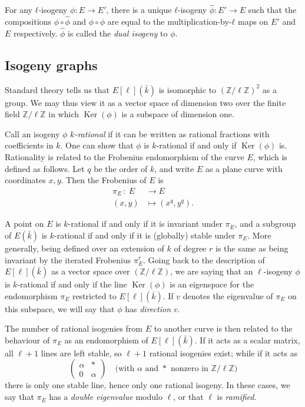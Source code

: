 \documentclass{article}
\newcommand{\Z}{\mathbb{Z}}
\newcommand{\from}{\ensuremath{\,:\ }}
\theoremstyle{definition}
\DeclareMathOperator{\Ker}{Ker}
\begin{document}
For any $ℓ$-isogeny $ϕ:E→E'$, there is a unique $ℓ$-isogeny
$\hat{ϕ}:E'→E$ such that the compositions $ϕ∘\hat{ϕ}$ and $\hat{ϕ}∘ϕ$
are equal to the multiplication-by-$ℓ$ maps on $E'$ and $E$
respectively. $\hat{ϕ}$ is called the \emph{dual isogeny} to $ϕ$.


\subsection{Isogeny graphs}


Standard theory tells us that $E[\ell](\bar{k})$ is isomorphic to $(\Z/\ell\Z)^2$
as a group. We may thus view it as a vector space of dimension two over the 
finite field $\Z/\ell\Z$ in which $\Ker(\phi)$ is a subspace of dimension one. 

Call an isogeny $\phi$ \emph{$k$-rational} if it can be written as rational 
fractions with coefficients in $k$. One can show that $\phi$ is $k$-rational if 
and only if $\Ker(\phi)$ is.
Rationality is related to the Frobenius endomorphism of the curve $E$, which is 
defined as follows. Let $q$ be the order of $k$, and write $E$ as a plane curve 
with coordinates $x, y$. Then the Frobenius of $E$ is
\[
\begin{aligned}
\pi_E \from E &\to E \\
 (x, y) &\mapsto (x^q, y^q).
\end{aligned}
\]

A point on $E$ is $k$-rational if and only if it is invariant under $\pi_E$, 
and a subgroup of $E(\bar{k})$ is $k$-rational if and only if it is (globally) 
stable under $\pi_E$. More generally, being defined over an extension of $k$
of degree $r$ is the same as being invariant by the iterated Frobenius $\pi_E^r$.
Going back to the description of $E[\ell](\bar{k})$ as a 
vector space over $(\Z/\ell\Z)$, we are saying that an $\ell$-isogeny $\phi$ is 
$k$-rational if and only if the line $\Ker(\phi)$ is an eigenspace for the 
endomorphism $\pi_E$ restricted to $E[\ell](\bar{k})$. If $v$ denotes the 
eigenvalue of $\pi_E$ on this subspace, we will say that $\phi$ has \emph{
direction $v$}.


The number of rational isogenies from $E$ to another curve is then related to 
the behaviour of $\pi_E$ as an endomorphism of $E[\ell](\bar{k})$. If it acts 
as a scalar matrix, all $\ell+1$ lines are left stable, so $\ell+1$ rational 
isogenies exist; while if it acts as
\[
\left(
\begin{matrix}
\alpha & * \\
0 & \alpha
\end{matrix}
\right)
\quad
\text{(with $\alpha$ and $*$ nonzero in $\Z/\ell\Z$)}
\]
there is only one stable line, hence only one rational isogeny. In these cases, 
we say that $\pi_E$ has a \emph{double eigenvalue} modulo $\ell$, or that $\ell$
 is \emph{ramified}.
\end{document}
